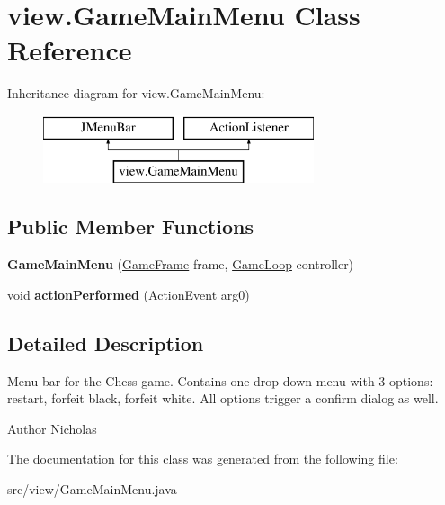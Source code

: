 \hypertarget{classview_1_1_game_main_menu}{\section{view.\-Game\-Main\-Menu Class Reference}
\label{classview_1_1_game_main_menu}
}
Inheritance diagram for view.\-Game\-Main\-Menu\-:\begin{figure}[H]
\begin{center}
\leavevmode
\includegraphics[height=2.000000cm]{classview_1_1_game_main_menu}
\end{center}
\end{figure}
\subsection*{Public Member Functions}
\begin{DoxyCompactItemize}
\item 
\hypertarget{classview_1_1_game_main_menu_a9b03f24e413bbc59660d24f951551068}{{\bfseries Game\-Main\-Menu} (\hyperlink{classview_1_1_game_frame}{Game\-Frame} frame, \hyperlink{classcontroller_1_1_game_loop}{Game\-Loop} controller)}\label{classview_1_1_game_main_menu_a9b03f24e413bbc59660d24f951551068}

\item 
\hypertarget{classview_1_1_game_main_menu_a28cee0ae7e5466223e0e56dc359b00c0}{void {\bfseries action\-Performed} (Action\-Event arg0)}\label{classview_1_1_game_main_menu_a28cee0ae7e5466223e0e56dc359b00c0}

\end{DoxyCompactItemize}


\subsection{Detailed Description}
Menu bar for the Chess game. Contains one drop down menu with 3 options\-: restart, forfeit black, forfeit white. All options trigger a confirm dialog as well.

\begin{DoxyAuthor}{Author}
Nicholas 
\end{DoxyAuthor}


The documentation for this class was generated from the following file\-:\begin{DoxyCompactItemize}
\item 
src/view/Game\-Main\-Menu.\-java\end{DoxyCompactItemize}
